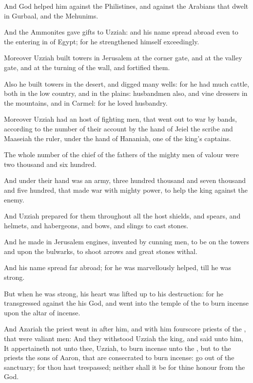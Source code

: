 \Verse And God helped him against the Philistines, and against the Arabians that dwelt in Gurbaal, and the Mehunims.

\Verse And the Ammonites gave gifts to Uzziah: and his name spread abroad even to the entering in of Egypt; for he strengthened himself exceedingly.

\Verse Moreover Uzziah built towers in Jerusalem at the corner gate, and at the valley gate, and at the turning of the wall, and fortified them.

\Verse Also he built towers in the desert, and digged many wells: for he had much cattle, both in the low country, and in the plains: husbandmen also, and vine dressers in the mountains, and in Carmel: for he loved husbandry.

\Verse Moreover Uzziah had an host of fighting men, that went out to war by bands, according to the number of their account by the hand of Jeiel the scribe and Maaseiah the ruler, under the hand of Hananiah, one of the king's captains.

\Verse The whole number of the chief of the fathers of the mighty men of valour were two thousand and six hundred.

\Verse And under their hand was an army, three hundred thousand and seven thousand and five hundred, that made war with mighty power, to help the king against the enemy.

\Verse And Uzziah prepared for them throughout all the host shields, and spears, and helmets, and habergeons, and bows, and slings to cast stones.

\Verse And he made in Jerusalem engines, invented by cunning men, to be on the towers and upon the bulwarks, to shoot arrows and great stones withal.

And his name spread far abroad; for he was marvellously helped, till he was strong.

\Verse But when he was strong, his heart was lifted up to his destruction: for he transgressed against the \LORD his God, and went into the temple of the \LORD to burn incense upon the altar of incense.

\Verse And Azariah the priest went in after him, and with him fourscore priests of the \LORD, that were valiant men: \Verse And they withstood Uzziah the king, and said unto him, It appertaineth not unto thee, Uzziah, to burn incense unto the \LORD, but to the priests the sons of Aaron, that are consecrated to burn incense: go out of the sanctuary; for thou hast trespassed; neither shall it be for thine honour from the \LORD God.

